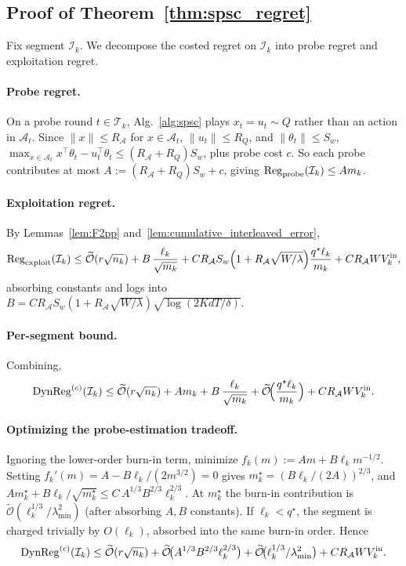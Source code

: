 \documentclass{article}
\newcommand{\cA}{\mathcal{A}}
\newcommand{\cT}{\mathcal{T}}
\newcommand{\cI}{\mathcal{I}}
\newcommand{\tilO}{\widetilde{\mathcal{O}}}
\newcommand{\DynReg}{\mathrm{DynReg}}
\begin{document}
\subsection{Proof of Theorem~\ref{thm:spsc_regret}}
\label{app:proof_main}

Fix segment $\cI_k$. We decompose the costed regret on $\cI_k$ into
probe regret and exploitation regret.

\paragraph{Probe regret.}
On a probe round $t\in\cT_k$, Alg.~\ref{alg:spsc} plays
$x_t=u_t\sim Q$ rather than an action in $\cA_t$. Since
$\|x\|\le R_\cA$ for $x\in\cA_t$, $\|u_t\|\le R_Q$, and
$\|\theta_t\|\le S_w$, $\max_{x\in\cA_t}x^\top\theta_t-u_t^\top\theta_t\le(R_\cA+R_Q)S_w$,
plus probe cost $c$. So each probe contributes at most
$A:=(R_\cA+R_Q)S_w+c$, giving
$\mathrm{Reg}_{\rm probe}(\cI_k)\le A m_k$.

\paragraph{Exploitation regret.}
By Lemmas~\ref{lem:F2pp} and~\ref{lem:cumulative_interleaved_error},
\[
\mathrm{Reg}_{\rm exploit}(\cI_k)
\le \tilO(r\sqrt{n_k})
+ B\,\frac{\ell_k}{\sqrt{m_k}}
+ C R_\cA S_w\Bigl(1+R_\cA\sqrt{W/\lambda}\Bigr)\frac{q^\star\ell_k}{m_k}
+ C R_\cA W V_k^{\rm in},
\]
absorbing constants and logs into
$B=C R_\cA S_w(1+R_\cA\sqrt{W/\lambda})\sqrt{\log(2KdT/\delta)}$.

\paragraph{Per-segment bound.} Combining,
\begin{equation}
\DynReg^{(c)}(\cI_k)
\le \tilO(r\sqrt{n_k})
+ A m_k + B\,\frac{\ell_k}{\sqrt{m_k}}
+ \tilO\!\Bigl(\frac{q^\star\ell_k}{m_k}\Bigr)
+ C R_\cA W V_k^{\rm in}.
\label{eq:per_segment}
\end{equation}

\paragraph{Optimizing the probe-estimation tradeoff.}
Ignoring the lower-order burn-in term, minimize
$f_k(m):=A m+B \ell_k m^{-1/2}$. Setting
$f_k'(m)=A-B\ell_k/(2m^{3/2})=0$ gives
$m_k^\star=(B\ell_k/(2A))^{2/3}$, and
$A m_k^\star+B\ell_k/\sqrt{m_k^\star}\le C\,A^{1/3}B^{2/3}\ell_k^{2/3}$.
At $m_k^\star$ the burn-in contribution is
$\tilO(\ell_k^{1/3}/\lambda_{\min}^2)$ (after absorbing $A,B$
constants). If $\ell_k<q^\star$, the segment is charged trivially by
$O(\ell_k)$, absorbed into the same burn-in order. Hence
\begin{equation}
\DynReg^{(c)}(\cI_k)
\le \tilO(r\sqrt{n_k})
+ \tilO\!\bigl(A^{1/3}B^{2/3}\ell_k^{2/3}\bigr)
+ \tilO\!\bigl(\ell_k^{1/3}/\lambda_{\min}^2\bigr)
+ C R_\cA W V_k^{\rm in}.
\label{eq:per_segment_opt}
\end{equation}
\end{document}
